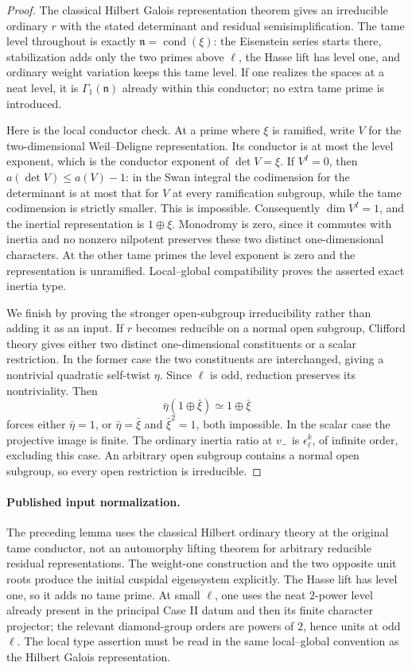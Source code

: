 \begin{proof}
The classical Hilbert Galois representation theorem gives an
irreducible ordinary \(r\) with the stated determinant and
residual semisimplification.
The tame level throughout is exactly
\(\mathfrak n=\operatorname{cond}(\xi)\):
the Eisenstein series starts there, stabilization adds only
the two primes above \(\ell\), the Hasse lift has level one,
and ordinary weight variation keeps this tame level.
If one realizes the spaces at a neat level, it is
\(\Gamma_1(\mathfrak n)\) already within this conductor;
no extra tame prime is introduced.

Here is the local conductor check.
At a prime where \(\xi\) is ramified, write \(V\) for the
two-dimensional Weil--Deligne representation.
Its conductor is at most the level exponent, which is the
conductor exponent of \(\det V=\xi\).
If \(V^I=0\), then
\(a(\det V)\le a(V)-1\):
in the Swan integral the codimension for the determinant is
at most that for \(V\) at every ramification subgroup, while
the tame codimension is strictly smaller.
This is impossible. Consequently \(\dim V^I=1\), and the
inertial representation is \(1\oplus\xi\).
Monodromy is zero, since it commutes with inertia and no
nonzero nilpotent preserves these two distinct one-dimensional
characters. At the other tame primes the level exponent is
zero and the representation is unramified.
Local--global compatibility proves the asserted exact inertia
type.

We finish by proving the stronger open-subgroup irreducibility
rather than adding it as an input.
If \(r\) becomes reducible on a normal open subgroup, Clifford
theory gives either two distinct one-dimensional constituents
or a scalar restriction.
In the former case the two constituents are interchanged,
giving a nontrivial quadratic self-twist \(\eta\).
Since \(\ell\) is odd, reduction preserves its nontriviality.
Then
\[
 \bar\eta(1\oplus\bar\xi)\simeq1\oplus\bar\xi
\]
forces either \(\bar\eta=1\), or
\(\bar\eta=\bar\xi\) and \(\bar\xi^2=1\), both impossible.
In the scalar case the projective image is finite.
The ordinary inertia ratio at \(v_-\) is
\(\epsilon_\ell^k\), of infinite order, excluding this case.
An arbitrary open subgroup contains a normal open subgroup,
so every open restriction is irreducible.
\end{proof}

\paragraph{Published input normalization.}
The preceding lemma uses the classical Hilbert ordinary theory
at the original tame conductor, not an automorphy lifting
theorem for arbitrary reducible residual representations.
The weight-one construction and the two opposite unit roots
produce the initial cuspidal eigensystem explicitly.
The Hasse lift has level one, so it adds no tame prime.
At small \(\ell\), one uses the neat \(2\)-power level already
present in the principal Case II datum and then its finite
character projector; the relevant diamond-group orders are
powers of \(2\), hence units at odd \(\ell\).
The local type assertion must be read in the same
local--global convention as the Hilbert Galois representation.

